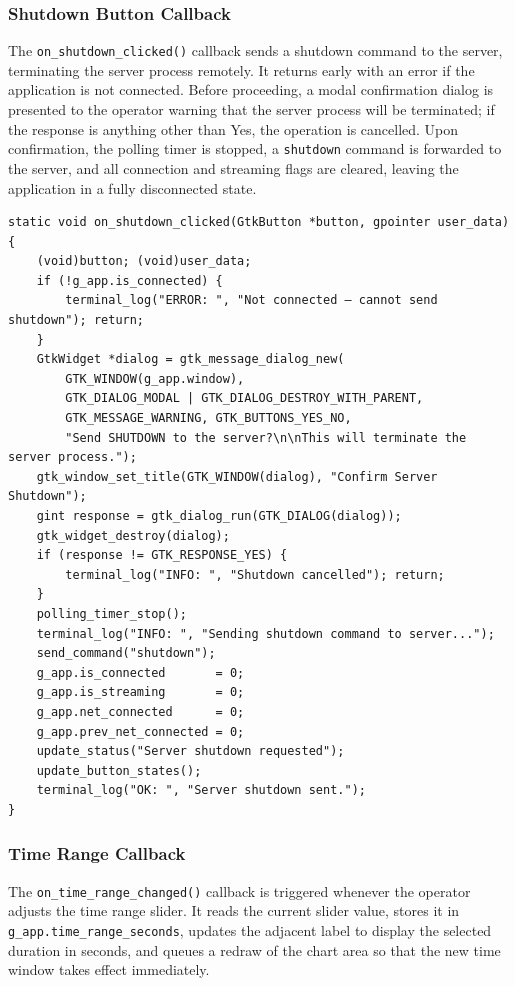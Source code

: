 \subsubsection{Shutdown Button Callback}

The \texttt{on\_shutdown\_clicked()} callback sends a shutdown command
to the server, terminating the server process remotely. It returns early
with an error if the application is not connected. Before proceeding, a
modal confirmation dialog is presented to the operator warning that the
server process will be terminated; if the response is anything other than
Yes, the operation is cancelled. Upon confirmation, the polling timer is
stopped, a \texttt{shutdown} command is forwarded to the server, and all
connection and streaming flags are cleared, leaving the application in a
fully disconnected state.

\begin{verbatim}
static void on_shutdown_clicked(GtkButton *button, gpointer user_data) {
    (void)button; (void)user_data;
    if (!g_app.is_connected) {
        terminal_log("ERROR: ", "Not connected — cannot send shutdown"); return;
    }
    GtkWidget *dialog = gtk_message_dialog_new(
        GTK_WINDOW(g_app.window),
        GTK_DIALOG_MODAL | GTK_DIALOG_DESTROY_WITH_PARENT,
        GTK_MESSAGE_WARNING, GTK_BUTTONS_YES_NO,
        "Send SHUTDOWN to the server?\n\nThis will terminate the server process.");
    gtk_window_set_title(GTK_WINDOW(dialog), "Confirm Server Shutdown");
    gint response = gtk_dialog_run(GTK_DIALOG(dialog));
    gtk_widget_destroy(dialog);
    if (response != GTK_RESPONSE_YES) {
        terminal_log("INFO: ", "Shutdown cancelled"); return;
    }
    polling_timer_stop();
    terminal_log("INFO: ", "Sending shutdown command to server...");
    send_command("shutdown");
    g_app.is_connected       = 0;
    g_app.is_streaming       = 0;
    g_app.net_connected      = 0;
    g_app.prev_net_connected = 0;
    update_status("Server shutdown requested");
    update_button_states();
    terminal_log("OK: ", "Server shutdown sent.");
}
\end{verbatim}


\subsubsection{Time Range Callback}

The \texttt{on\_time\_range\_changed()} callback is triggered whenever
the operator adjusts the time range slider. It reads the current slider
value, stores it in \texttt{g\_app.time\_range\_seconds}, updates the
adjacent label to display the selected duration in seconds, and queues
a redraw of the chart area so that the new time window takes effect
immediately.

